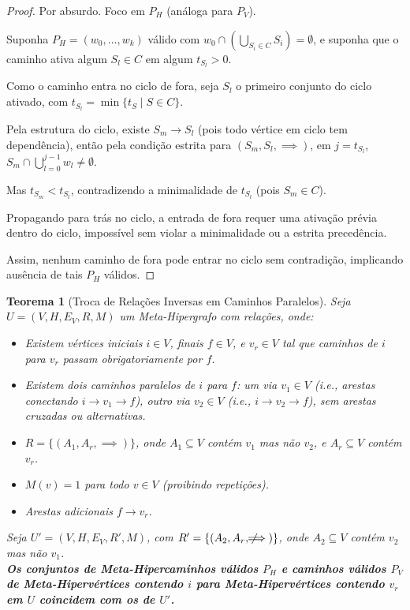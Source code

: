 \documentclass{article}
\newtheorem{theorem}{Teorema}
\begin{document}
\begin{proof}
Por absurdo. Foco em \( P_H \) (análoga para \( P_V \)).

Suponha \( P_H = (w_0, \dots, w_k) \) válido com \( w_0 \cap \left( \bigcup_{S_i \in C} S_i \right) = \emptyset \), e suponha que o caminho ativa algum \( S_l \in C \) em algum \( t_{S_l} > 0 \).

Como o caminho entra no ciclo de fora, seja \( S_l \) o primeiro conjunto do ciclo ativado, com \( t_{S_l} = \min \{ t_S \mid S \in C \} \).

Pela estrutura do ciclo, existe \( S_m \to S_l \) (pois todo vértice em ciclo tem dependência), então pela condição estrita para \( (S_m, S_l, \implies) \), em \( j = t_{S_l} \), \( S_m \cap \bigcup_{l=0}^{j-1} w_l \neq \emptyset \).

Mas \( t_{S_m} < t_{S_l} \), contradizendo a minimalidade de \( t_{S_l} \) (pois \( S_m \in C \)).

Propagando para trás no ciclo, a entrada de fora requer uma ativação prévia dentro do ciclo, impossível sem violar a minimalidade ou a estrita precedência.

Assim, nenhum caminho de fora pode entrar no ciclo sem contradição, implicando ausência de tais \( P_H \) válidos.
\end{proof}

\newpage
\begin{theorem}[Troca de Relações Inversas em Caminhos Paralelos]
\hfill

Seja \( U = (V, H, E_V, R, M) \) um Meta-Hipergrafo com relações, onde:

\begin{itemize}
    \item Existem vértices iniciais \( i \in V \), finais \( f \in V \), e \( v_r \in V \) tal que caminhos de \( i \) para \( v_r \) passam obrigatoriamente por \( f \).
    \item Existem dois caminhos paralelos de \( i \) para \( f \): um via \( v_1 \in V \) (i.e., arestas conectando \( i \to v_1 \to f \)), outro via \( v_2 \in V \) (i.e., \( i \to v_2 \to f \)), sem arestas cruzadas ou alternativas.
    \item \( R = \{ (A_1, A_r, \implies) \} \), onde \( A_1 \subseteq V \) contém \( v_1 \) mas não \( v_2 \), e \( A_r \subseteq V \) contém \( v_r \).
    \item \( M(v) = 1 \) para todo \( v \in V \) (proibindo repetições).
    \item Arestas adicionais \( f \to v_r \).
\end{itemize}

Seja \( U' = (V, H, E_V, R', M) \), com \( R' = \{ (A_2, A_r, \not\!\!\!\implies) \} \), onde \( A_2 \subseteq V \) contém \( v_2 \) mas não \( v_1 \).
\\

\textbf{Os conjuntos de Meta-Hipercaminhos válidos \( P_H \) e caminhos válidos \( P_V \) de Meta-Hipervértices contendo \( i \) para Meta-Hipervértices contendo \( v_r \) em \( U \) coincidem com os de \( U' \).}
\end{theorem}
\end{document}
